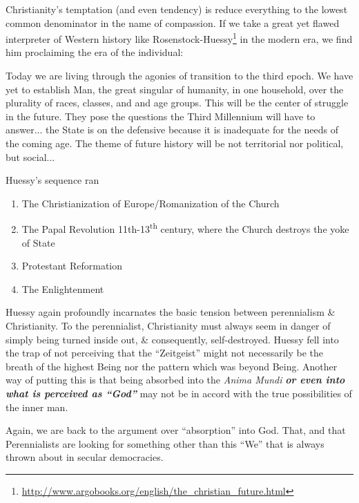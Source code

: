 Christianity's temptation (and even tendency) is reduce everything to the lowest common denominator in the name of compassion. If we take a great yet flawed interpreter of Western history like Rosenstock-Huessy\footnote{\url{http://www.argobooks.org/english/the\_christian\_future.html}} in the modern era, we find him proclaiming the era of the individual:

\begin{quotex}
Today we are living through the agonies of transition to the third epoch. We have yet to establish Man, the great singular of humanity, in one household, over the plurality of races, classes, and and age groups. This will be the center of struggle in the future. They pose the questions the Third Millennium will have to answer... the State is on the defensive because it is inadequate for the needs of the coming age. The theme of future history will be not territorial nor political, but social...
\end{quotex}


Huessy's sequence ran

\begin{enumerate}


\item The Christianization of Europe/Romanization of the Church

\item The Papal Revolution 11th-13\textsuperscript{th} century, where the Church destroys the yoke of State

\item Protestant Reformation

\item The Enlightenment
\end{enumerate}


Huessy again profoundly incarnates the basic tension between perennialism \& Christianity. To the perennialist, Christianity must always seem in danger of simply being turned inside out, \& consequently, self-destroyed. Huessy fell into the trap of not perceiving that the ``Zeitgeist'' might not necessarily be the breath of the highest Being nor the pattern which was beyond Being. Another way of putting this is that being absorbed into the \emph{Anima Mundi} \emph{\textbf{or even into what is perceived as ``God''}} may not be in accord with the true possibilities of the inner man.

Again, we are back to the argument over ``absorption'' into God. That, and that Perennialists are looking for something other than this ``We'' that is always thrown about in secular democracies.

